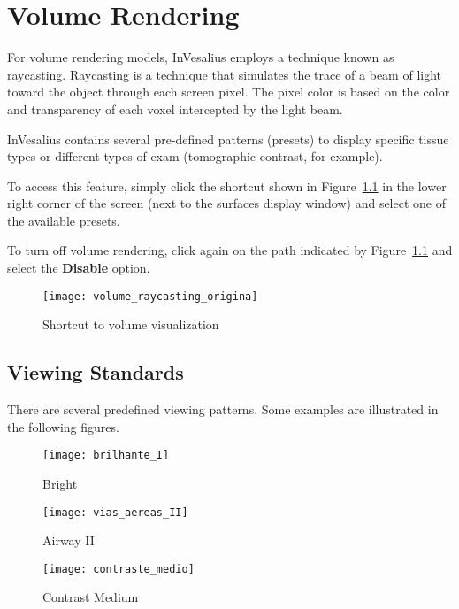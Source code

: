 \chapter{Volume Rendering}
\label{cap:vis_vol}

For volume rendering models, InVesalius employs a technique known as raycasting. Raycasting is a technique that simulates the trace of a beam of light toward the object through each screen pixel. The pixel color is based on the color and transparency of each voxel intercepted by the light beam.

InVesalius contains several pre-defined patterns (presets) to display specific tissue types or different types of exam (tomographic contrast, for example).

To access this feature, simply click the shortcut shown in Figure~\ref{fig:volume_raycasting_origina} in the lower right corner of the screen (next to the surfaces display window) and select one of the available presets.

To turn off volume rendering, click again on the path indicated by Figure~\ref{fig:volume_raycasting_origina} and select the \textbf{Disable} option.

\begin{figure}[!htb]
\centering
\texttt{[image: volume\_raycasting\_origina]}
\caption{Shortcut to volume visualization}
\label{fig:volume_raycasting_origina}
\end{figure}

\section{Viewing Standards}

There are several predefined viewing patterns. Some examples are illustrated in the following figures.

\begin{figure}[!htb]
\centering
\texttt{[image: brilhante\_I]}
\caption{Bright}
\label{fig:brilhante_I}
\end{figure}

\begin{figure}[!htb]
\centering 
\texttt{[image: vias\_aereas\_II]}
\caption{Airway II}
\label{fig:vias_aereas_II} 
\end{figure}

\begin{figure}[!htb]
\centering
\texttt{[image: contraste\_medio]}
\caption{Contrast Medium}
\label{fig:contraste_medio}
\end{figure}


